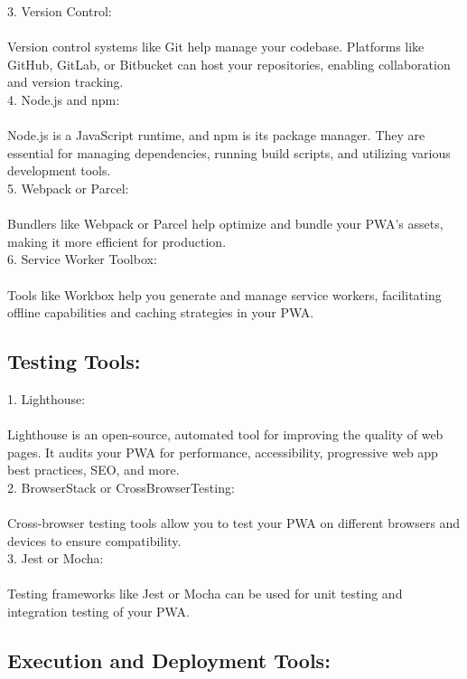 \documentclass[journal]{IEEEtran}
\begin{document}
3. Version Control:\\
   \\Version control systems like Git help manage your codebase. Platforms like GitHub, GitLab, or Bitbucket can host your repositories, enabling collaboration and version tracking.\\

4. Node.js and npm:\\
   \\Node.js is a JavaScript runtime, and npm is its package manager. They are essential for managing dependencies, running build scripts, and utilizing various development tools.\\

5. Webpack or Parcel:\\
   \\Bundlers like Webpack or Parcel help optimize and bundle your PWA's assets, making it more efficient for production.\\

6. Service Worker Toolbox:\\
   \\Tools like Workbox help you generate and manage service workers, facilitating offline capabilities and caching strategies in your PWA.\\

\subsection{Testing Tools:}

1. Lighthouse:\\
   \\Lighthouse is an open-source, automated tool for improving the quality of web pages. It audits your PWA for performance, accessibility, progressive web app best practices, SEO, and more.\\

2. BrowserStack or CrossBrowserTesting:\\
   \\Cross-browser testing tools allow you to test your PWA on different browsers and devices to ensure compatibility.\\

3. Jest or Mocha:\\
   \\Testing frameworks like Jest or Mocha can be used for unit testing and integration testing of your PWA.\\

\subsection{Execution and Deployment Tools:}
\end{document}
